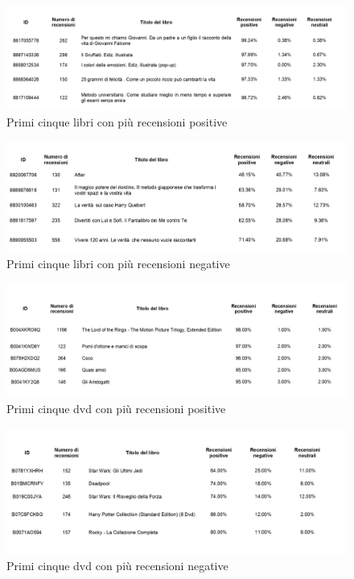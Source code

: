 			\begin{figure} [h]
				\includegraphics[width=\textwidth]{Figure/top_pos_book_table}
				\caption{Primi cinque libri con più recensioni positive}
				\label{fig:top_pos_book_table}
			\end{figure}
			
			\begin{figure} [h]
				\includegraphics[width=\textwidth]{Figure/top_neg_book_table}
				\caption{Primi cinque libri con più recensioni negative}
				\label{fig:top_neg_book_table}
			\end{figure}
		
			\begin{figure} [h]
				\includegraphics[width=\textwidth]{Figure/top_pos_film_table}
				\caption{Primi cinque dvd con più recensioni positive}
				\label{fig:top_pos_film_table}
			\end{figure}
		
			\begin{figure} [h]
				\includegraphics[width=\textwidth]{Figure/top_neg_film_table}
				\caption{Primi cinque dvd con più recensioni negative}
				\label{fig:top_neg_film_table}
			\end{figure}
		
